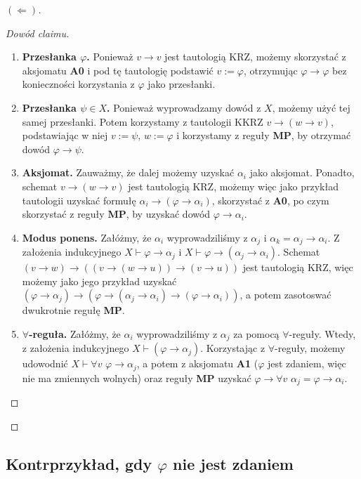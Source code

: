 \begin{proof}[\( (\Leftarrow) \)]
\begin{proof}[Dowód claimu]
    \begin{enumerate}
        \item \textbf{Przesłanka \( \varphi \).} Ponieważ \( v \to v \) jest tautologią KRZ, możemy skorzystać z aksjomatu \textbf{A0} i pod tę tautologię podstawić \(v := \varphi \), otrzymując \( \varphi \to \varphi \) bez konieczności korzystania z \( \varphi \) jako przesłanki.
        \item \textbf{Przesłanka \( \psi \in X \).} Ponieważ wyprowadzamy dowód z \( X \), możemy użyć tej samej przesłanki. Potem korzystamy z tautologii KKRZ \( v \to (w \to v) \), podstawiając w niej \( v := \psi \), \( w := \varphi \) i korzystamy z reguły \textbf{MP}, by otrzymać dowód \( \varphi \to \psi \).
        \item \textbf{Aksjomat.} Zauważmy, że dalej możemy uzyskać \( \alpha_i \) jako aksjomat. Ponadto, schemat \( v \to (w \to v) \) jest tautologią KRZ, możemy więc jako przykład tautologii uzyskać formułę \( \alpha_i \to (\varphi \to \alpha_i) \), skorzystać z \textbf{A0}, po czym skorzystać z reguły \textbf{MP}, by uzyskać dowód \( \varphi \to \alpha_i \).
        \item \textbf{Modus ponens.} Załóżmy, że \( \alpha_i \) wyprowadziliśmy z \( \alpha_j \) i \( \alpha_k = \alpha_j \to \alpha_i \). Z założenia indukcyjnego \( X \vdash \varphi \to \alpha_j \) i \( X \vdash \varphi \to (\alpha_j \to \alpha_i) \). Schemat \( (v \to w) \to ((v \to (w \to u)) \to (v \to u)) \) jest tautologią KRZ, więc możemy jako jego przykład uzyskać \( (\varphi \to \alpha_j) \to (\varphi \to (\alpha_j \to \alpha_i) \to (\varphi \to \alpha_i)) \), a potem zasotoswać dwukrotnie regułę \textbf{MP}.
        \item \textbf{\( \forall \)-reguła.} Załóżmy, że \( \alpha_i \) wyprowadziliśmy z \( \alpha_j \) za pomocą \( \forall \)-reguły. Wtedy, z założenia indukcyjnego \( X \vdash (\varphi \to \alpha_j) \). Korzystając z \( \forall \)-reguły, możemy udowodnić \( X \vdash \forall v\,\,\varphi \to \alpha_j \), a potem z aksjomatu \textbf{A1} (\( \varphi \) jest zdaniem, więc nie ma zmiennych wolnych) oraz reguły \textbf{MP} uzyskać \( \varphi \to \forall v\,\,\alpha_j = \varphi \to \alpha_i \).
    \end{enumerate}
    
\end{proof}

\end{proof}

\subsection*{Kontrprzykład, gdy \(\varphi\) nie jest zdaniem}

